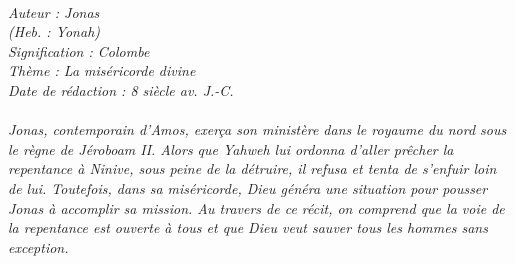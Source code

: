 \BFont
\noindent\hrulefill
{\footnotesize
\textit{
\bigskip
{\centering{}
\\Auteur : Jonas
\\(Heb. : Yonah)
\\Signification : Colombe
\\Thème : La miséricorde divine
\\Date de rédaction : 8 siècle av. J.-C.\\}
}
\textit{
\\Jonas, contemporain d'Amos, exerça son ministère dans le royaume du nord sous le règne de Jéroboam II. Alors que Yahweh lui ordonna d'aller prêcher la repentance à Ninive, sous peine de la détruire, il refusa et tenta de s'enfuir loin de lui. Toutefois, dans sa miséricorde, Dieu généra une situation pour pousser Jonas à accomplir sa mission. Au travers de ce récit, on comprend que la voie de la repentance est ouverte à tous et que Dieu veut sauver tous les hommes sans exception.\bigskip
}
}
\par\nobreak\noindent\hrulefill
